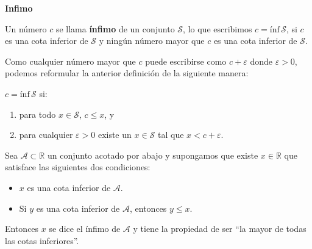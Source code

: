 \vspace{0.21cm}
\begin{tcolorbox}
	\begin{defi}\textbf{Infimo}\end{defi}
	Un número $c$ se llama \textbf{ínfimo} de un conjunto $\mathcal{S}$, lo que escribimos $c = \text{ínf} \, \mathcal{S}$, si $c$ es una cota inferior de $\mathcal{S}$ y ningún número mayor que $c$ es una cota inferior de $\mathcal{S}$.
	
	Como cualquier número mayor que $c$ puede escribirse como $c+\varepsilon$  donde $\varepsilon > 0$, podemos reformular la anterior definición de la siguiente manera:
	
	\vspace{0.35cm}
	$c = \text{ínf} \,\mathcal{S}$ si:
	
	\begin{enumerate}
		\item para todo $x \in \mathcal{S}$, $c \leq x$, y
		\item para cualquier $\varepsilon > 0$ existe un $x \in \mathcal{S}$ tal que $x < c + \varepsilon$. \cite{haaser}
	\end{enumerate}
	
	
	Sea $\mathcal{A} \subset \mathbb{R}$ un conjunto acotado por abajo y supongamos que existe $x\in \mathbb{R}$ que satisface las siguientes dos condiciones:
	
	\begin{itemize}
		\item $x$ es una cota inferior de $\mathcal{A}$.
		\item Si $y$ es una cota inferior de $\mathcal{A}$, entonces $y \leq x$.
	\end{itemize}
	Entonces $x$ se dice el ínfimo de $\mathcal{A}$ y tiene la propiedad de ser “la mayor de todas las cotas inferiores”. \cite{zill}
\end{tcolorbox}